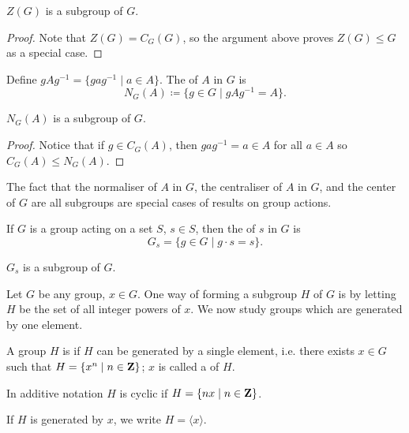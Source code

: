 \begin{proposition}
$Z(G)$ is a subgroup of $G$.
\end{proposition}

\begin{proof}
Note that $Z(G)=C_G(G)$, so the argument above proves $Z(G)\le G$ as a special case.
\end{proof}

\begin{definition}[Normaliser]
Define $gAg^{-1}=\{gag^{-1}\mid a\in A\}$. The  of $A$ in $G$ is
\[N_G(A)\coloneqq\{g\in G\mid gAg^{-1}=A\}.\]
\end{definition}

\begin{proposition}
$N_G(A)$ is a subgroup of $G$.
\end{proposition}

\begin{proof}
Notice that if $g\in C_G(A)$, then $gag^{-1}=a\in A$ for all $a\in A$ so $C_G(A)\le N_G(A)$.
\end{proof}

The fact that the normaliser of $A$ in $G$, the centraliser of $A$ in $G$, and the center of $G$ are all subgroups are special cases of results on group actions.

\begin{definition}[Stabiliser]
If $G$ is a group acting on a set $S$, $s\in S$, then the  of $s$ in $G$ is
\[G_s=\{g\in G\mid g\cdot s=s\}.\]
\end{definition}

\begin{proposition}
$G_s$ is a subgroup of $G$.
\end{proposition}

Let $G$ be any group, $x\in G$. One way of forming a subgroup $H$ of $G$ is by letting $H$ be the set of all integer powers of $x$. We now study groups which are generated by one element.

\begin{definition}
A group $H$ is  if $H$ can be generated by a single element, i.e. there exists $x\in G$ such that $H=\{x^n\mid n\in\mathbf Z\}$; $x$ is called a  of $H$.

In additive notation $H$ is cyclic if $H=\{nx\mid n\in\mathbf Z\}$.
\end{definition}

\begin{notation}
If $H$ is generated by $x$, we write $H=\langle x\rangle$.
\end{notation}

